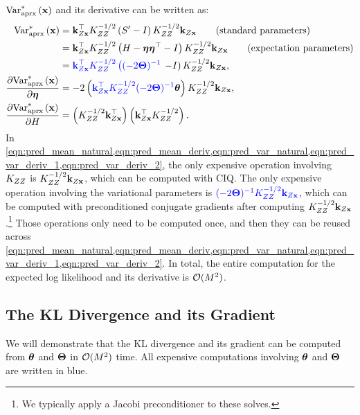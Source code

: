 $\text{Var}^*_\text{aprx} \left( \mathbf{x} \right)$ and its derivative can be written as:
%
\begin{align}
  \text{Var}^*_\text{aprx} \left( \mathbf{x} \right)
  &= \mathbf{k}_{Z \mathbf{x}}^\top K_{ZZ}^{-1/2} \left( S' - I \right) K_{ZZ}^{-1/2} \mathbf{k}_{Z \mathbf{x}}
  \tag{standard parameters} \\
  &= \mathbf{k}_{Z \mathbf{x}}^\top K_{ZZ}^{-1/2} \left( H - \boldsymbol{\eta} \boldsymbol{\eta}^\top - I \right) K_{ZZ}^{-1/2} \mathbf{k}_{Z \mathbf{x}}
  \tag{expectation parameters} \\
  &= {\color{blue} \mathbf{k}_{Z \mathbf{x}}^\top K_{ZZ}^{-1/2} \left((-2 \boldsymbol{\Theta})^{-1} \right.} \left. - I \right) K_{ZZ}^{-1/2} \mathbf{k}_{Z \mathbf{x}}
  \label{eqn:pred_var_natural},
  \\
  \frac{\partial \text{Var}^*_\text{aprx} \left( \mathbf{x} \right)}{\partial \boldsymbol{\eta}}
  &= -2 \left( {\color{blue} \mathbf{k}_{Z \mathbf{x}}^\top K_{ZZ}^{-1/2} (-2 \boldsymbol{\Theta})^{-1}} \boldsymbol{\theta} \right) K_{ZZ}^{-1/2} \mathbf{k}_{Z \mathbf{x}}
  \label{eqn:pred_var_deriv_1},
  \\
  \frac{\partial \text{Var}^*_\text{aprx} \left( \mathbf{x} \right)}{\partial H}
  &= \left( K_{ZZ}^{-1/2} \mathbf{k}_{Z \mathbf{x}}^\top \right) \left( \mathbf{k}_{Z \mathbf{x}}^\top K_{ZZ}^{-1/2} \right)
  \label{eqn:pred_var_deriv_2}.
\end{align}
%
In \cref{eqn:pred_mean_natural,eqn:pred_mean_deriv,eqn:pred_var_natural,eqn:pred_var_deriv_1,eqn:pred_var_deriv_2}, the only expensive operation involving $K_{ZZ}$ is $K_{ZZ}^{-1/2} \mathbf{k}_{Z \mathbf{x}}$, which can be computed with CIQ.
The only expensive operation involving the variational parameters is ${\color{blue} (-2 \boldsymbol{\Theta})^{-1} K_{ZZ}^{-1/2} \mathbf{k}_{Z \mathbf{x}}}$, which can be computed with preconditioned conjugate gradients after computing $K_{ZZ}^{-1/2} \mathbf{k}_{Z \mathbf{x}}$.\footnote{
  We typically apply a Jacobi preconditioner to these solves.
}
Those operations only need to be computed once, and then they can be reused across \cref{eqn:pred_mean_natural,eqn:pred_mean_deriv,eqn:pred_var_natural,eqn:pred_var_deriv_1,eqn:pred_var_deriv_2}.
In total, the entire computation for the expected log likelihood and its derivative is $\bigo{M^2}$.

\subsection{The KL Divergence and its Gradient}
We will demonstrate that the KL divergence and its gradient can be computed from $\boldsymbol{\theta}$ and $\boldsymbol{\Theta}$ in $\bigo{M^2}$ time.
All expensive computations involving $\boldsymbol{\theta}$ and $\boldsymbol{\Theta}$ are written in {\color{blue} blue}.

